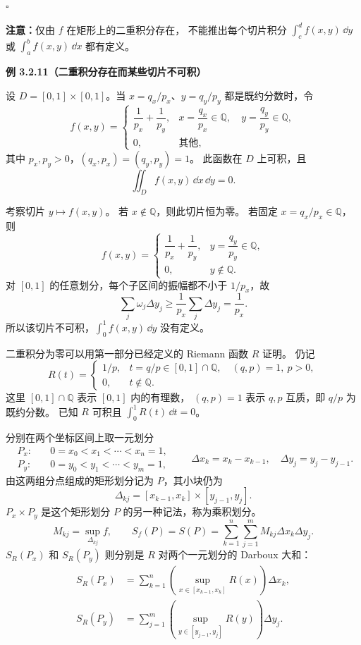 $\square$



\textbf{注意：}仅由 $f$ 在矩形上的二重积分存在，
不能推出每个切片积分
$\displaystyle\int_c^d f(x,y)\,\dd y$ 或 $\displaystyle\int_a^b f(x,y)\,\dd x$ 都有定义。



\textbf{例 3.2.11（二重积分存在而某些切片不可积）}


设 $D=[0,1]\times[0,1]$。当 $x=q_x/p_x$、$y=q_y/p_y$
都是既约分数时，令
\[
f(x,y)=
\begin{cases}
\dfrac1{p_x}+\dfrac1{p_y},
&x=\dfrac{q_x}{p_x}\in\mathbb Q,\quad
y=\dfrac{q_y}{p_y}\in\mathbb Q,\\[6pt]
0,&\text{其他},
\end{cases}
\]
其中 $p_x,p_y>0$，$(q_x,p_x)=(q_y,p_y)=1$。
此函数在 $D$ 上可积，且
\[
\iint_D f(x,y)\,\dd x\,\dd y=0.
\]

考察切片 $y\mapsto f(x,y)$。
若 $x\notin\mathbb Q$，则此切片恒为零。
若固定 $x=q_x/p_x\in\mathbb Q$，则
\[
f(x,y)=
\begin{cases}
\dfrac1{p_x}+\dfrac1{p_y},&y=\dfrac{q_y}{p_y}\in\mathbb Q,\\[6pt]
0,&y\notin\mathbb Q.
\end{cases}
\]
对 $[0,1]$ 的任意划分，每个子区间的振幅都不小于 $1/p_x$，故
\[
\sum_j\omega_j\Delta y_j
\ge\frac1{p_x}\sum_j\Delta y_j=\frac1{p_x}.
\]
所以该切片不可积，$\int_0^1 f(x,y)\,\dd y$ 没有定义。

二重积分为零可以用第一部分已经定义的 Riemann 函数 $R$ 证明。
仍记
\[
R(t)=
\begin{cases}
1/p,&t=q/p\in[0,1]\cap\mathbb Q,\quad (q,p)=1,\ p>0,\\
0,&t\notin\mathbb Q.
\end{cases}
\]
这里 $[0,1]\cap\mathbb Q$ 表示 $[0,1]$ 内的有理数，
$(q,p)=1$ 表示 $q,p$ 互质，即 $q/p$ 为既约分数。
已知 $R$ 可积且 $\displaystyle\int_0^1R(t)\,\dd t=0$。

分别在两个坐标区间上取一元划分
\[
\begin{aligned}
P_x:&\quad 0=x_0<x_1<\cdots<x_n=1,\\
P_y:&\quad 0=y_0<y_1<\cdots<y_m=1,
\end{aligned}
\qquad
\Delta x_k=x_k-x_{k-1},\quad
\Delta y_j=y_j-y_{j-1}.
\]
由这两组分点组成的矩形划分记为 $P$，其小块仍为
\[
\Delta_{kj}=[x_{k-1},x_k]\times[y_{j-1},y_j].
\]
$P_x\times P_y$ 是这个矩形划分 $P$ 的另一种记法，称为乘积划分。
\[
M_{kj}=\sup_{\Delta_{kj}}f,\qquad
S_f(P)=S(P)=\sum_{k=1}^n\sum_{j=1}^m
M_{kj}\Delta x_k\Delta y_j.
\]
$S_R(P_x)$ 和 $S_R(P_y)$ 则分别是 $R$ 对两个一元划分的 Darboux 大和：
\[
\begin{aligned}
S_R(P_x)
&=\sum_{k=1}^n
\left(\sup_{x\in[x_{k-1},x_k]}R(x)\right)\Delta x_k,\\
S_R(P_y)
&=\sum_{j=1}^m
\left(\sup_{y\in[y_{j-1},y_j]}R(y)\right)\Delta y_j.
\end{aligned}
\]


